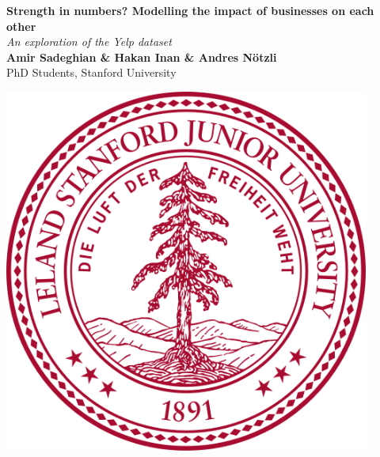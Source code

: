 \documentclass[a0,landscape,beamer]{a0poster}
\begin{document}


\begin{minipage}[b]{0.8\linewidth}
\veryHuge \color{NavyBlue} \textbf{Strength in numbers? Modelling the impact of businesses on each other} \color{Black}\\ %
\Huge\textit{An exploration of the Yelp dataset}\\[1cm] %
\huge \textbf{Amir Sadeghian \& Hakan Inan \& Andres N\"otzli}\\ %
\huge PhD Students, Stanford University\\ %
\end{minipage}
%
\begin{minipage}[t]{0.2\linewidth}
\includegraphics[width=12cm]{logo.png} %
\end{minipage}
\end{document}
